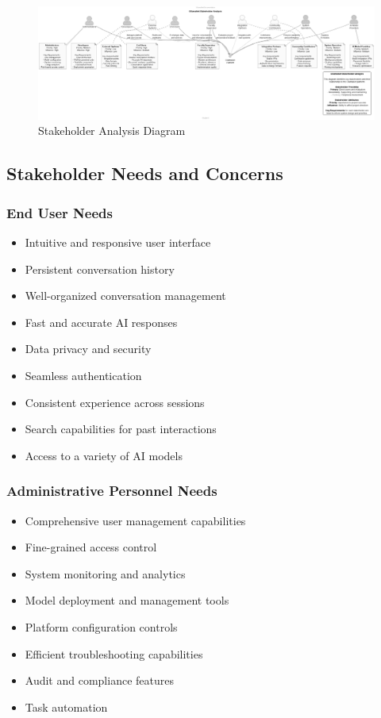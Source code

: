 \begin{figure}[p]
    \centering
    \includegraphics[width=\textwidth]{./Chapter03/figures/Stakeholder_Analysis.png}
    \caption{Stakeholder Analysis Diagram}
    \label{fig:stakeholder-analysis}
\end{figure}
\clearpage

\subsection{Stakeholder Needs and Concerns}

\subsubsection*{End User Needs}
\begin{itemize}
   \item Intuitive and responsive user interface
   \item Persistent conversation history
   \item Well-organized conversation management
   \item Fast and accurate AI responses
   \item Data privacy and security
   \item Seamless authentication
   \item Consistent experience across sessions
   \item Search capabilities for past interactions
   \item Access to a variety of AI models
\end{itemize}

\subsubsection*{Administrative Personnel Needs}
\begin{itemize}
   \item Comprehensive user management capabilities
   \item Fine-grained access control
   \item System monitoring and analytics
   \item Model deployment and management tools
   \item Platform configuration controls
   \item Efficient troubleshooting capabilities
   \item Audit and compliance features
   \item Task automation
\end{itemize}

